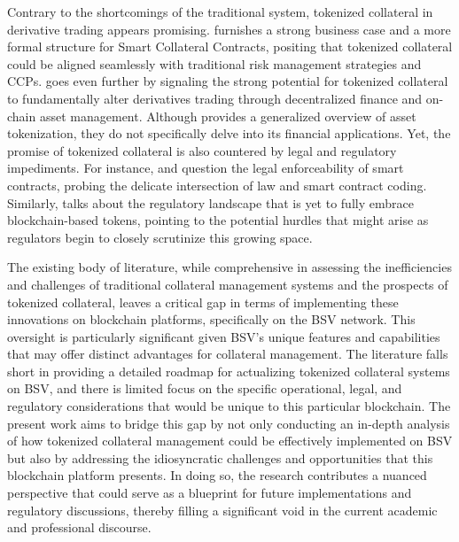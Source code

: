 Contrary to the shortcomings of the traditional system, tokenized collateral in derivative trading appears promising. \citep{morini2016blockchain} furnishes a strong business case and a more formal structure for Smart Collateral Contracts, positing that tokenized collateral could be aligned seamlessly with traditional risk management strategies and CCPs. \citep{schar2021decentralized} goes even further by signaling the strong potential for tokenized collateral to fundamentally alter derivatives trading through decentralized finance and on-chain asset management. Although \citep{lesavre2020blockchain} provides a generalized overview of asset tokenization, they do not specifically delve into its financial applications. Yet, the promise of tokenized collateral is also countered by legal and regulatory impediments. For instance, \citep{giancaspro2017smart} and \citep{raskin2016law} question the legal enforceability of smart contracts, probing the delicate intersection of law and smart contract coding. Similarly, \citep{ferreira2020emerging} talks about the regulatory landscape that is yet to fully embrace blockchain-based tokens, pointing to the potential hurdles that might arise as regulators begin to closely scrutinize this growing space.

The existing body of literature, while comprehensive in assessing the inefficiencies and challenges of traditional collateral management systems and the prospects of tokenized collateral, leaves a critical gap in terms of implementing these innovations on blockchain platforms, specifically on the BSV network. This oversight is particularly significant given BSV's unique features and capabilities that may offer distinct advantages for collateral management. The literature falls short in providing a detailed roadmap for actualizing tokenized collateral systems on BSV, and there is limited focus on the specific operational, legal, and regulatory considerations that would be unique to this particular blockchain. The present work aims to bridge this gap by not only conducting an in-depth analysis of how tokenized collateral management could be effectively implemented on BSV but also by addressing the idiosyncratic challenges and opportunities that this blockchain platform presents. In doing so, the research contributes a nuanced perspective that could serve as a blueprint for future implementations and regulatory discussions, thereby filling a significant void in the current academic and professional discourse.